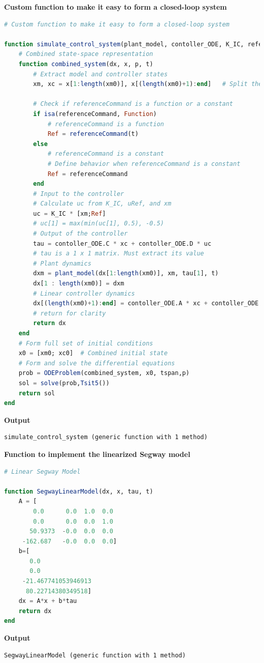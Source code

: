 \textbf{Custom function to make it easy to form a closed-loop system}
\begin{lstlisting}[language=Julia,style=mystyle]
# Custom function to make it easy to form a closed-loop system

function simulate_control_system(plant_model, contoller_ODE, K_IC, referenceCommand, xm0, xc0, tspan,p)
    # Combined state-space representation
    function combined_system(dx, x, p, t)
        # Extract model and controller states
        xm, xc = x[1:length(xm0)], x[(length(xm0)+1):end]   # Split the state variables
        
        # Check if referenceCommand is a function or a constant
        if isa(referenceCommand, Function)
            # referenceCommand is a function
            Ref = referenceCommand(t)
        else
            # referenceCommand is a constant
            # Define behavior when referenceCommand is a constant
            Ref = referenceCommand
        end        
        # Input to the controller
        # Calculate uc from K_IC, uRef, and xm
        uc = K_IC * [xm;Ref]
        # uc[1] = max(min(uc[1], 0.5), -0.5)
        # Output of the controller
        tau = contoller_ODE.C * xc + contoller_ODE.D * uc   
        # tau is a 1 x 1 matrix. Must extract its value
        # Plant dynamics
        dxm = plant_model(dx[1:length(xm0)], xm, tau[1], t)  
        dx[1 : length(xm0)] = dxm 
        # Linear controller dynamics
        dx[(length(xm0)+1):end] = contoller_ODE.A * xc + contoller_ODE.B * uc  
        # return for clarity
        return dx 
    end
    # Form full set of initial conditions 
    x0 = [xm0; xc0]  # Combined initial state
    # Form and solve the differential equations
    prob = ODEProblem(combined_system, x0, tspan,p)
    sol = solve(prob,Tsit5())    
    return sol
end
\end{lstlisting}
\textbf{Output} 
\begin{verbatim}
simulate_control_system (generic function with 1 method)
\end{verbatim}

\textbf{Function to implement the linearized Segway model}
\begin{lstlisting}[language=Julia,style=mystyle]
# Linear Segway Model

function SegwayLinearModel(dx, x, tau, t)
    A = [
        0.0      0.0  1.0  0.0
        0.0      0.0  0.0  1.0
       50.9373  -0.0  0.0  0.0
     -162.687   -0.0  0.0  0.0]
    b=[
       0.0
       0.0
     -21.467741053946913
      80.22714380349518]
    dx = A*x + b*tau
    return dx
end
\end{lstlisting}
\textbf{Output} 
\begin{verbatim}
SegwayLinearModel (generic function with 1 method)
\end{verbatim}

